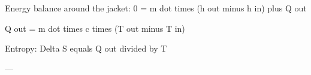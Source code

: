 Energy balance around the jacket:  
0 = m dot times (h out minus h in) plus Q out  

Q out = m dot times c times (T out minus T in)  

Entropy:  
Delta S equals Q out divided by T  

---